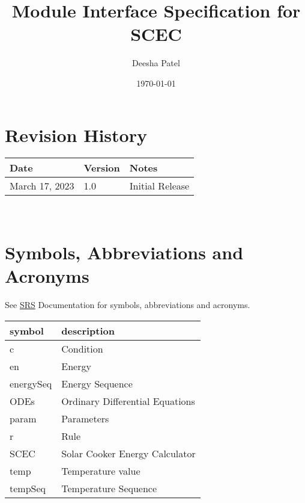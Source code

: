 \documentclass[12pt, titlepage]{article}
\begin{document}
\title{Module Interface Specification for SCEC }

\author{Deesha Patel}

\date{\today}

\maketitle


\section{Revision History}

\begin{tabularx}{\textwidth}{p{3cm}p{2cm}X}
\toprule {\bf Date} & {\bf Version} & {\bf Notes}\\
\midrule
March 17, 2023 & 1.0 & Initial Release\\
\bottomrule
\end{tabularx}

~\newpage

\section{Symbols, Abbreviations and Acronyms}

See \href{https://github.com/DeeshaPatel/CAS-741-Solar-Cooker/blob/c7cc1be3611cae9110b84940b64ef40c7d29aa02/docs/SRS/SRS.pdf}{SRS} Documentation for symbols, abbreviations and acronyms. \\ 

\renewcommand{\arraystretch}{1.2}
\begin{tabular}{l l} 
  \toprule		
  \textbf{symbol} & \textbf{description}\\
  \midrule 
  c & Condition\\
  en & Energy \\
  energySeq & Energy Sequence\\
  ODEs & Ordinary Differential Equations \\ 
  param & Parameters\\
  r & Rule  \\
  SCEC & Solar Cooker Energy Calculator \\
  temp & Temperature value \\
  tempSeq & Temperature Sequence \\
  \bottomrule
\end{tabular}\\
\end{document}
